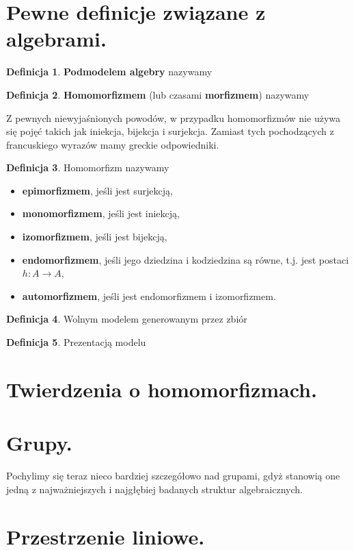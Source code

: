 \documentclass{article}
\theoremstyle{definition}
\newtheorem{definition}{Definicja}[section]
\begin{document}
\section{Pewne definicje związane z algebrami.}

\begin{definition}
    \textbf{Podmodelem algebry} nazywamy
\end{definition}

\begin{definition}
    \textbf{Homomorfizmem} (lub czasami \textbf{morfizmem}) nazywamy
\end{definition}

Z pewnych niewyjaśnionych powodów,
    w przypadku homomorfizmów nie używa się pojęć takich jak iniekcja, bijekcja i surjekcja.
Zamiast tych pochodzących z francuskiego wyrazów mamy greckie odpowiedniki.

\begin{definition}
    Homomorfizm nazywamy
    \begin{itemize}
        \item \textbf{epimorfizmem}, jeśli jest surjekcją,
        \item \textbf{monomorfizmem}, jeśli jest iniekcją,
        \item \textbf{izomorfizmem}, jeśli jest bijekcją,
        \item \textbf{endomorfizmem}, jeśli jego dziedzina i kodziedzina są równe, t.j. jest postaci $h:A \to A$,
        \item \textbf{automorfizmem}, jeśli jest endomorfizmem i izomorfizmem.
    \end{itemize}
\end{definition}

\begin{definition}
    Wolnym modelem generowanym przez zbiór 
\end{definition}

\begin{definition}
    Prezentacją modelu
\end{definition}

\section{Twierdzenia o homomorfizmach.}

\section{Grupy.}

Pochylimy się teraz nieco bardziej szczegółowo nad grupami,
gdyż stanowią one jedną z najważniejszych i najgłębiej badanych struktur algebraicznych.



\section{Przestrzenie liniowe.}
\end{document}
